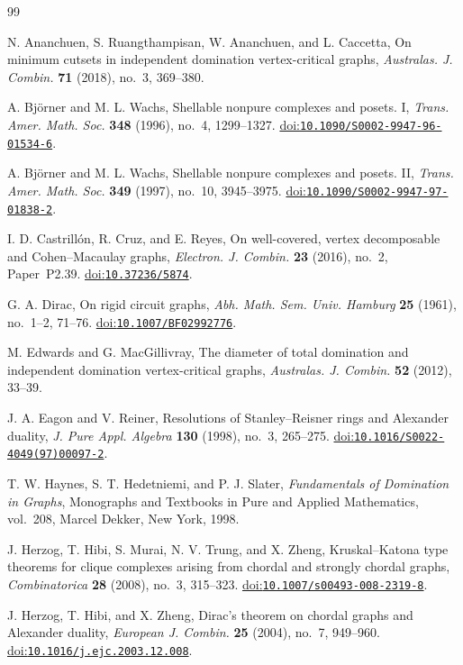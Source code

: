 \documentclass[11pt]{amsart}
\theoremstyle{definition}
\newcommand{\doi}[1]{\href{https://doi.org/#1}{doi:\nolinkurl{#1}}}
\begin{document}
	\begin{thebibliography}{99}
		
		 N. Ananchuen, S. Ruangthampisan, W. Ananchuen, and L. Caccetta, On minimum cutsets in independent domination vertex-critical graphs, \emph{Australas. J. Combin.} \textbf{71} (2018), no.~3, 369--380.
		
		A. Bj\"orner and M. L. Wachs, Shellable nonpure complexes and posets. I, \emph{Trans. Amer. Math. Soc.} \textbf{348} (1996), no.~4, 1299--1327. \doi{10.1090/S0002-9947-96-01534-6}.
		
		A. Bj\"orner and M. L. Wachs, Shellable nonpure complexes and posets. II, \emph{Trans. Amer. Math. Soc.} \textbf{349} (1997), no.~10, 3945--3975. \doi{10.1090/S0002-9947-97-01838-2}.
		
		 I. D. Castrill\'on, R. Cruz, and E. Reyes, On well-covered, vertex decomposable and Cohen--Macaulay graphs, \emph{Electron. J. Combin.} \textbf{23} (2016), no.~2, Paper~P2.39. \doi{10.37236/5874}.
		
		G. A. Dirac, On rigid circuit graphs, \emph{Abh. Math. Sem. Univ. Hamburg} \textbf{25} (1961), no.~1--2, 71--76. \doi{10.1007/BF02992776}.
		
		 M. Edwards and G. MacGillivray, The diameter of total domination and independent domination vertex-critical graphs, \emph{Australas. J. Combin.} \textbf{52} (2012), 33--39.
		
		J. A. Eagon and V. Reiner, Resolutions of Stanley--Reisner rings and Alexander duality, \emph{J. Pure Appl. Algebra} \textbf{130} (1998), no.~3, 265--275. \doi{10.1016/S0022-4049(97)00097-2}.
		
		T. W. Haynes, S. T. Hedetniemi, and P. J. Slater, \emph{Fundamentals of Domination in Graphs}, Monographs and Textbooks in Pure and Applied Mathematics, vol.~208, Marcel Dekker, New York, 1998.
		
		J. Herzog, T. Hibi, S. Murai, N. V. Trung, and X. Zheng, Kruskal--Katona type theorems for clique complexes arising from chordal and strongly chordal graphs, \emph{Combinatorica} \textbf{28} (2008), no.~3, 315--323. \doi{10.1007/s00493-008-2319-8}.
		
		J. Herzog, T. Hibi, and X. Zheng, Dirac's theorem on chordal graphs and Alexander duality, \emph{European J. Combin.} \textbf{25} (2004), no.~7, 949--960. \doi{10.1016/j.ejc.2003.12.008}.
		

\end{thebibliography}
\end{document}
